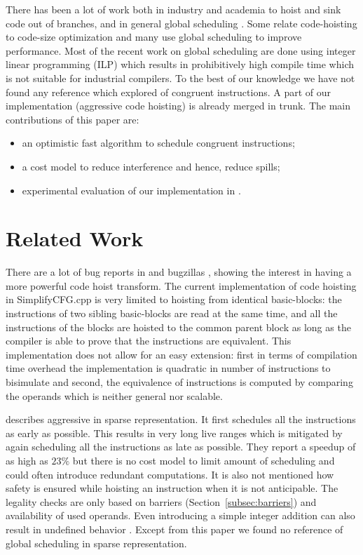\documentclass[sigplan,10pt,review,anonymous]{acmart}\settopmatter{printfolios=true,printccs=false,printacmref=false}
\begin{document}
There has been a lot of work both in industry and academia to hoist and sink
code out of branches, and in general global scheduling
\cite{click1995global}. Some relate code-hoisting to code-size optimization
\cite{rosen1988global} and many \cite{barany2013, shobaki2013} use global
scheduling to improve performance. Most of the recent work on global scheduling
are done using integer linear programming (ILP) which results in prohibitively
high compile time which is not suitable for industrial compilers. To the best of
our knowledge we have not found any reference which explored \gcm{} of congruent
instructions. A part of our implementation (aggressive code hoisting) is already
merged in \LLVM{} trunk. The main contributions of this paper are:
\begin{itemize}[leftmargin=*,topsep=0pt]
\item an optimistic fast algorithm to schedule congruent instructions;
\item a cost model to reduce interference and hence, reduce spills;
\item experimental evaluation of our implementation in \LLVM{}.
\end{itemize}

\section{Related Work}

There are a lot of bug reports in \GCC{} and \LLVM{} bugzillas
\cite{GCCCodeHoistingBugs, LLVMCodeHoistingBugs}, showing the interest in having
a more powerful code hoist transform.  The current \LLVM{} implementation of
code hoisting in SimplifyCFG.cpp is very limited to hoisting from identical
basic-blocks: the instructions of two sibling basic-blocks are read at the same
time, and all the instructions of the blocks are hoisted to the common parent
block as long as the compiler is able to prove that the instructions are
equivalent.  This implementation does not allow for an easy extension: first in
terms of compilation time overhead the implementation is quadratic in number of
instructions to bisimulate and second, the equivalence of instructions is
computed by comparing the operands which is neither general nor scalable.

\citet{click1995global} describes aggressive \gcm{} in sparse representation. It
first schedules all the instructions as early as possible. This results in very
long live ranges which is mitigated by again scheduling all the instructions as
late as possible. They report a speedup of as high as $23\%$ but there is no
cost model to limit amount of scheduling and could often introduce redundant
computations. It is also not mentioned how safety is ensured while hoisting an
instruction when it is not anticipable. The legality checks are only based on
barriers (Section~\ref{subsec:barriers}) and availability of used operands. Even
introducing a simple integer addition can also result in undefined behavior
\cite{undef}.  Except from this paper we found no reference of global scheduling
in sparse representation.
\end{document}
